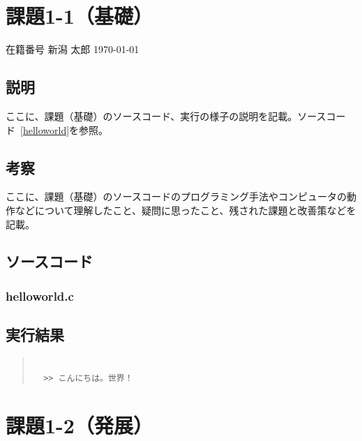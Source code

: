 \documentclass[a4paper,12pt,uplatex]{jsarticle}
\newcommand{\mynumber}{在籍番号} %
\newcommand{\myname}{新潟 太郎} %
\newcommand{\myheader}{ %

\begin{flushright}
\mynumber\hspace{1zw} \myname\hspace{1zw} \today\end{flushright}}
\begin{document}

\section*{課題1-1（基礎）}

\myheader

\subsection*{説明}

ここに、課題（基礎）のソースコード、実行の様子の説明を記載。ソースコード~\ref{helloworld}を参照。

\subsection*{考察}

ここに、課題（基礎）のソースコードのプログラミング手法やコンピュータの動作などについて理解したこと、疑問に思ったこと、残された課題と改善策などを記載。

\subsection*{ソースコード}

\subsubsection*{helloworld.c}


\subsection*{実行結果}

\begin{quote}
\begin{verbatim}

  >> こんにちは。世界！

\end{verbatim}
\end{quote}


\newpage

\section*{課題1-2（発展）}
\end{document}
